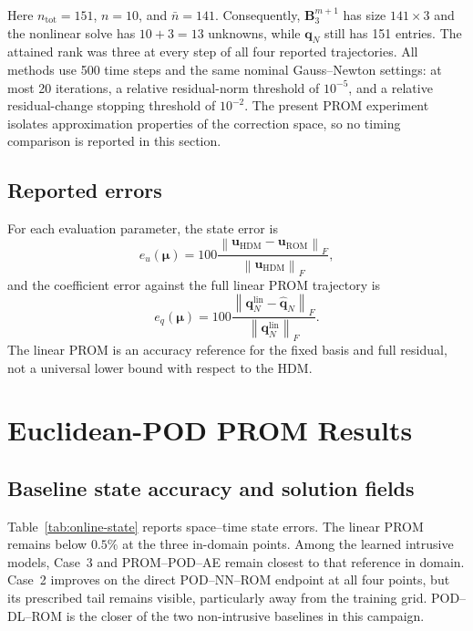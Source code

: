 \documentclass[11pt]{article}
\newcommand{\q}{\mathbf q}
\newcommand{\uvec}{\mathbf u}
\newcommand{\mub}{\bm\mu}
\newcommand{\norm}[1]{\left\lVert #1 \right\rVert}
\begin{document}
Here $n_{\mathrm{tot}}=151$, $n=10$, and $\bar n=141$.  Consequently,
$\mathbf B_3^{m+1}$ has size $141\times3$ and the nonlinear solve has
$10+3=13$ unknowns, while $\q_N$ still has 151 entries.  The attained rank
was three at every step of all four reported trajectories.  All methods use
500 time steps and the same nominal Gauss--Newton settings: at most 20
iterations, a relative residual-norm threshold of $10^{-5}$, and a
relative residual-change stopping threshold of $10^{-2}$.  The present PROM
experiment isolates approximation properties of the correction space, so no
timing comparison is reported in this section.

\subsection{Reported errors}
For each evaluation parameter, the state error is
\begin{equation}
e_u(\mub)=100\frac{\norm{\uvec_{\mathrm{HDM}}-\uvec_{\mathrm{ROM}}}_F}
{\norm{\uvec_{\mathrm{HDM}}}_F},
\label{eq:state-error}
\end{equation}
and the coefficient error against the full linear PROM trajectory is
\begin{equation}
e_q(\mub)=100\frac{\norm{\q_N^{\mathrm{lin}}-\widehat{\q}_N}_F}
{\norm{\q_N^{\mathrm{lin}}}_F}.
\label{eq:coefficient-error}
\end{equation}
The linear PROM is an accuracy reference for the fixed basis and full
residual, not a universal lower bound with respect to the HDM.

\section{Euclidean-POD PROM Results}
\label{sec:prom-results}
\subsection{Baseline state accuracy and solution fields}
Table~\ref{tab:online-state} reports space--time state errors.  The linear
PROM remains below $0.5\%$ at the three in-domain points.  Among the learned
intrusive models, Case~3 and PROM--POD--AE remain closest to that reference in
domain.  Case~2 improves on the direct POD--NN--ROM endpoint at all four
points, but its prescribed tail remains visible, particularly away from the
training grid.  POD--DL--ROM is the closer of the two non-intrusive baselines
in this campaign.

\begin{table}[H]
\centering
\caption{Online state errors $100\norm{\uvec_{\mathrm{HDM}}-\uvec_{\mathrm{ROM}}}_F/
\norm{\uvec_{\mathrm{HDM}}}_F$.  The mean averages the three in-domain
points.  The horizontal rule separates intrusive residual-minimizing models
from non-intrusive maps.}
\label{tab:online-state}
\resizebox{0.94\textwidth}{!}{}
\end{table}
\end{document}
